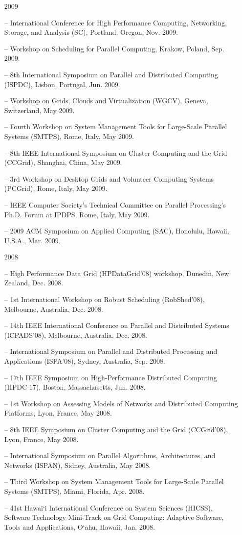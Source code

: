 \documentclass[times,11pt]{letter}
\begin{document}
\begin{itemize}
\item [2009]
\item[--]  International Conference for High Performance Computing, Networking, Storage, and Analysis (SC), Portland, Oregon, Nov. 2009.
\item[--]  Workshop on Scheduling for Parallel Computing, Krakow, Poland, Sep. 2009.
\item[--]  8th International Symposium on Parallel and Distributed Computing (ISPDC), Lisbon, Portugal, Jun. 2009.
\item[--]  Workshop on Grids, Clouds and Virtualization (WGCV), Geneva, Switzerland, May 2009.
\item[--]  Fourth Workshop on System Management Tools for Large-Scale Parallel Systems (SMTPS), Rome, Italy, May 2009.
\item[--]  8th IEEE International Symposium on Cluster Computing and the Grid (CCGrid), Shanghai, China, May 2009.
\item[--]  3rd Workshop on Desktop Grids and Volunteer Computing Systems (PCGrid), Rome, Italy, May 2009.
\item[--]  IEEE Computer Society's Technical Committee on Parallel Processing's Ph.D. Forum at IPDPS, Rome, Italy, May 2009.
\item[--]  2009 ACM Symposium on Applied Computing (SAC), Honolulu, Hawaii, U.S.A., Mar. 2009.

\item [2008]
\item[--]  High Performance Data Grid (HPDataGrid'08) workshop, Dunedin, New Zealand, Dec. 2008.
\item[--]  1st International Workshop on Robust Scheduling (RobShed'08), Melbourne, Australia, Dec. 2008.
\item[--]  14th IEEE International Conference on Parallel and Distributed Systems (ICPADS'08), Melbourne, Australia, Dec. 2008.
\item[--]  International Symposium on Parallel and Distributed Processing and Applications (ISPA'08), Sydney, Australia, Sep. 2008.
\item[--]  17th IEEE Symposium on High-Performance Distributed Computing (HPDC-17), Boston, Massachusetts, Jun. 2008. 
\item[--]  1st Workshop on Assessing Models of Networks and Distributed Computing Platforms, Lyon, France, May 2008. 
\item[--]  8th IEEE Symposium on Cluster Computing and the Grid (CCGrid'08), Lyon, France, May 2008. 
\item[--]  International Symposium on Parallel Algorithms, Architectures, and Networks (ISPAN), Sidney, Australia, May 2008.
\item[--]  Third Workshop on System Management Tools for Large-Scale Parallel Systems (SMTPS), Miami, Florida, Apr. 2008.
\item[--]  41st Hawai`i International Conference on System Sciences (HICSS), Software Technology Mini-Track on Grid Computing: Adaptive Software, Tools and Applications, O`ahu, Hawaii, Jan. 2008. 


\end{itemize}
\end{document}
